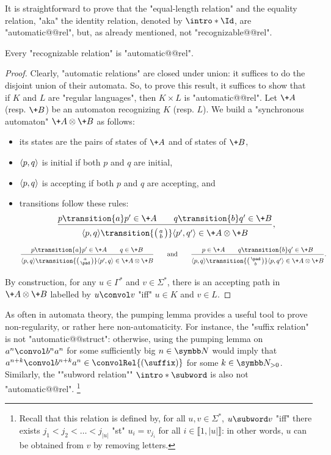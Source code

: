 It is straightforward to prove that the "equal-length relation"
and the equality relation, "aka" the identity relation, denoted
by \AP$\intro*\Id$, are "automatic@@rel", but, as already mentioned, not "recognizable@@rel".

\begin{proposition}
	\label{prop:rec-implies-aut}
	Every "recognizable relation" is "automatic@@rel".
\end{proposition}

\begin{proof}
	Clearly, "automatic relations" are closed under union: it suffices to do the disjoint union
	of their automata.
	So, to prove this result, it suffices to show that if $K$ and $L$ are "regular languages",
	then $K \times L$ is "automatic@@rel".
	Let $\+A$ (resp. $\+B$) be an automaton recognizing $K$ (resp. $L$). 
	We build a "synchronous automaton" $\+A \otimes \+B$ as follows:
	\begin{itemize}
		\item its states are the pairs of states of $\+A$ and of states of $\+B$,
		\item $\langle p,q\rangle$ is initial if both $p$ and $q$ are initial,
		\item $\langle p,q\rangle$ is accepting if both $p$ and $q$ are accepting, and
		\item transitions follow these rules:
		\[\frac{
			p \transition{a} p' \in \+A \qquad q \transition{b} q' \in \+B
		}{
			\vphantom{\Big()}
			\tup{p,q} \transition{\pair{a}{b}} \tup{p',q'}
				\in \+A \otimes \+B
		},\]
		\vspace{-1em}
		\[\frac{
			p \transition{a} p' \in \+A \qquad q \in \+B
		}{
			\vphantom{\Big()}
			\tup{p,q} \transition{\pair{a}{\pad}} \tup{p',q}
				\in \+A \otimes \+B
		}
		\qquad\text{and}\qquad
		\frac{
			p \in \+A \qquad q \transition{b} q' \in \+B
		}{
			\vphantom{\Big()}
			\tup{p,q} \transition{\pair{\pad}{b}} \tup{p,q'}
				\in \+A \otimes \+B
		}.
		\]
	\end{itemize}
	By construction, for any $u\in \Gamma^*$ and $v\in \Sigma^*$,
	there is an accepting path in $\+A \otimes \+B$ labelled by $u \convol v$ 
	"iff" $u \in K$ and $v\in L$.
\end{proof}

As often in automata theory, the pumping lemma provides a useful tool to prove
non-regularity, or rather here non-automaticity.
For instance, the "suffix relation" is not "automatic@@struct": otherwise,
using the pumping lemma on $a^n \convol b^n a^n$ for some sufficiently big $n\in\N$
would imply that $a^{n+k} \convol b^{n+k} a^n \in \convolRel{(\suffix)}$ for some $k\in\Np$.
Similarly, the \AP""subword relation"" $\intro*\subword$ is also not "automatic@@rel".%
\footnote{Recall that this relation is defined by, for all $u, v \in \Sigma^*$,
$u \subword v$ "iff" there exists $j_1 < j_2 < \dotsc < j_{|u|}$ "st" $u_i = v_{j_{i}}$
for all $i \in \lBrack 1, |u|\rBrack$: in other words, $u$ can be obtained from $v$ by removing letters.}

